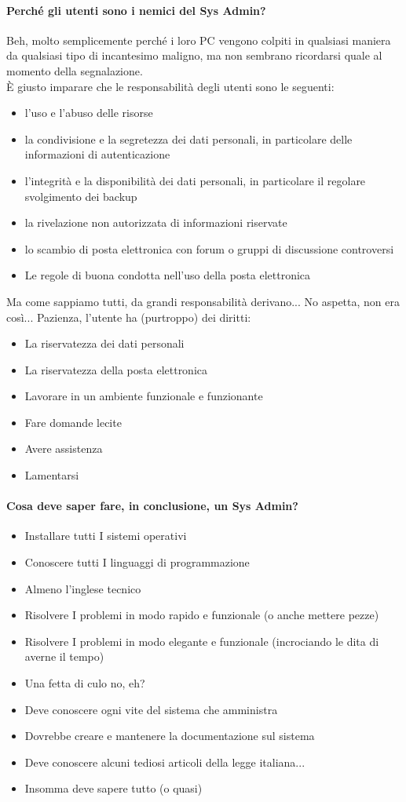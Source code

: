 \documentclass[a4paper]{report}
\begin{document}
\paragraph{Perché gli utenti sono i nemici del Sys Admin?}
Beh, molto semplicemente perché i loro PC vengono colpiti in qualsiasi maniera da qualsiasi tipo di incantesimo maligno, ma non sembrano ricordarsi quale al momento della segnalazione.\\
È giusto imparare che le responsabilità degli utenti sono le seguenti:
\begin{itemize}
\item l'uso e l'abuso delle risorse
\item la condivisione e la segretezza dei dati personali, in
particolare delle informazioni di autenticazione
\item l'integrità e la disponibilità dei dati personali, in particolare il
regolare svolgimento dei backup
\item la rivelazione non autorizzata di informazioni riservate
\item lo scambio di posta elettronica con forum o gruppi di
discussione controversi
\item Le regole di buona condotta nell'uso della posta elettronica
\end{itemize}
Ma come sappiamo tutti, da grandi responsabilità derivano... No aspetta, non era così... Pazienza, l'utente ha (purtroppo) dei diritti:
\begin{itemize}
\item La riservatezza dei dati personali
\item La riservatezza della posta elettronica
\item Lavorare in un ambiente funzionale e funzionante
\item Fare domande lecite
\item Avere assistenza
\item Lamentarsi
\end{itemize}
\paragraph{Cosa deve saper fare, in conclusione, un Sys Admin?}
\begin{itemize}
\item Installare tutti I sistemi operativi
\item Conoscere tutti I linguaggi di programmazione
\item Almeno l'inglese tecnico
\item Risolvere I problemi in modo rapido e funzionale (o anche mettere
pezze)
\item Risolvere I problemi in modo elegante e funzionale (incrociando le dita
di averne il tempo)
\item Una fetta di culo no, eh?
\item Deve conoscere ogni vite del sistema che amministra
\item Dovrebbe creare e mantenere la documentazione sul sistema
\item Deve conoscere alcuni tediosi articoli della legge italiana...
\item Insomma deve sapere tutto (o quasi)
\end{itemize}
\end{document}
